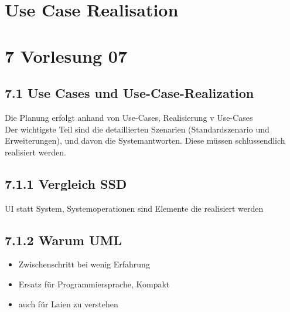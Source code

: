 \section{Use Case Realisation}

\section*{7 Vorlesung 07}
\subsection*{7.1 Use Cases und Use-Case-Realization}
Die Planung erfolgt anhand von Use-Cases, Realisierung v Use-Cases\\
Der wichtigste Teil sind die detaillierten Szenarien (Standardszenario und Erweiterungen), und davon die Systemantworten. Diese müssen schlussendlich realisiert werden.

\subsection*{7.1.1 Vergleich SSD}
UI statt System, Systemoperationen sind Elemente die realisiert werden

\subsection*{7.1.2 Warum UML}
\begin{itemize}
  \item Zwischenschritt bei wenig Erfahrung
  \item Ersatz für Programmiersprache, Kompakt
  \item auch für Laien zu verstehen
\end{itemize}

